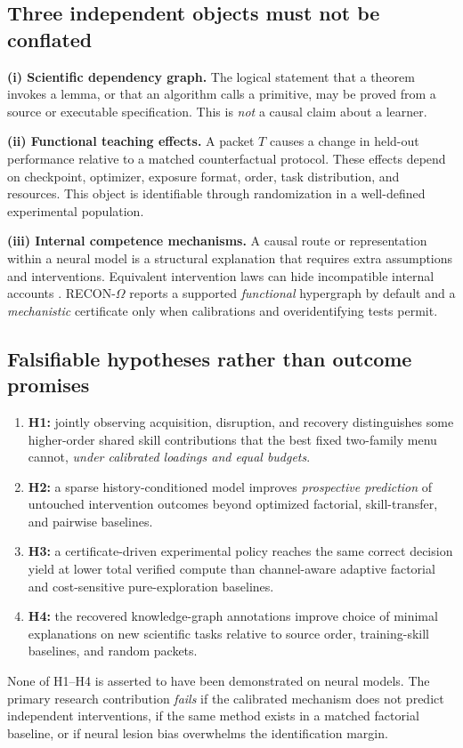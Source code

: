 \documentclass[11pt,a4paper]{article}
\theoremstyle{definition}\newtheorem{definition}[theorem]{Definition}
\theoremstyle{remark}\newtheorem{remark}[theorem]{Remark}
\begin{document}
\subsection{Three independent objects must not be conflated}
\textbf{(i) Scientific dependency graph.} The logical statement that a theorem invokes a lemma, or that an algorithm calls a primitive, may be proved from a source or executable specification. This is \emph{not} a causal claim about a learner.

\textbf{(ii) Functional teaching effects.} A packet $T$ causes a change in held-out performance relative to a matched counterfactual protocol. These effects depend on checkpoint, optimizer, exposure format, order, task distribution, and resources. This object is identifiable through randomization in a well-defined experimental population.

\textbf{(iii) Internal competence mechanisms.} A causal route or representation within a neural model is a structural explanation that requires extra assumptions and interventions. Equivalent intervention laws can hide incompatible internal accounts \citep{geiger,jaber,hu2025}. RECON-$\Omega$ reports a supported \emph{functional} hypergraph by default and a \emph{mechanistic} certificate only when calibrations and overidentifying tests permit.

\subsection{Falsifiable hypotheses rather than outcome promises}
\begin{enumerate}
\item \textbf{H1:} jointly observing acquisition, disruption, and recovery distinguishes some higher-order shared skill contributions that the best fixed two-family menu cannot, \emph{under calibrated loadings and equal budgets}.
\item \textbf{H2:} a sparse history-conditioned model improves \emph{prospective prediction} of untouched intervention outcomes beyond optimized factorial, skill-transfer, and pairwise baselines.
\item \textbf{H3:} a certificate-driven experimental policy reaches the same correct decision yield at lower total verified compute than channel-aware adaptive factorial and cost-sensitive pure-exploration baselines.
\item \textbf{H4:} the recovered knowledge-graph annotations improve choice of minimal explanations on new scientific tasks relative to source order, training-skill baselines, and random packets.
\end{enumerate}
None of H1--H4 is asserted to have been demonstrated on neural models. The primary research contribution \emph{fails} if the calibrated mechanism does not predict independent interventions, if the same method exists in a matched factorial baseline, or if neural lesion bias overwhelms the identification margin.
\end{document}

